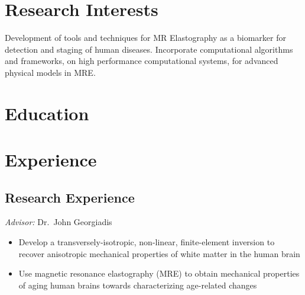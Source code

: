 \documentclass[11pt,letter,sans]{moderncv}
\begin{document}

\maketitle

\section{Research Interests}

Development of tools and techniques for MR Elastography as a biomarker for detection and staging of human diseases.
Incorporate computational algorithms and frameworks, on high performance computational systems, for advanced physical models in MRE.

\section{Education}





\section{Experience}

\subsection{Research Experience}

%
  {\textit{Advisor:} Dr.\ John Georgiadis
  \begin{itemize}
	\item Develop a transversely-isotropic, non-linear, finite-element inversion to recover anisotropic mechanical properties of white matter in the human brain
  	\item Use magnetic resonance elastography (MRE) to obtain mechanical properties of aging human brains towards characterizing age-related changes
  \end{itemize}
  }
\end{document}
